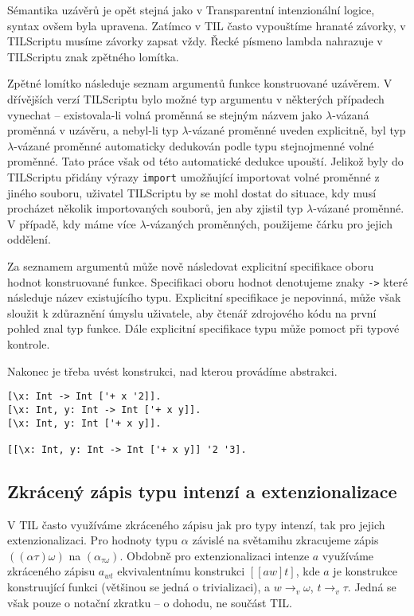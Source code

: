 Sémantika uzávěrů je opět stejná jako v Transparentní intenzionální logice, syntax ovšem byla
upravena. Zatímco v TIL často vypouštíme hranaté závorky, v TILScriptu musíme závorky zapsat vždy.
Řecké písmeno lambda nahrazuje v TILScriptu znak zpětného lomítka.

Zpětné lomítko následuje seznam argumentů funkce konstruované uzávěrem. V dřívějších verzí
TILScriptu bylo možné typ argumentu v některých případech vynechat -- existovala-li volná proměnná
se stejným názvem jako $\lambda$-vázaná proměnná v uzávěru, a nebyl-li typ $\lambda$-vázané
proměnné uveden explicitně, byl typ $\lambda$-vázané proměnné automaticky dedukován podle typu
stejnojmenné volné proměnné. Tato práce však od této automatické dedukce upouští. Jelikož byly
do TILScriptu přidány výrazy \lstinline{import} umožňující importovat volné proměnné z jiného
souboru, uživatel TILScriptu by se mohl dostat do situace, kdy musí procházet několik importovaných
souborů, jen aby zjistil typ $\lambda$-vázané proměnné. V případě, kdy máme více $\lambda$-vázaných
proměnných, použijeme čárku pro jejich oddělení.

Za seznamem argumentů může nově následovat explicitní specifikace oboru hodnot konstruované funkce.
Specifikaci oboru hodnot denotujeme znaky \lstinline{->} které následuje název existujícího typu.
Explicitní specifikace je nepovinná, může však sloužit k zdůraznění úmyslu uživatele, aby čtenář
zdrojového kódu na první pohled znal typ funkce. Dále explicitní specifikace typu může pomoct při
typové kontrole.

Nakonec je třeba uvést konstrukci, nad kterou provádíme abstrakci.

\begin{lstlisting}[caption={Příklad využití uzávěrů}]
[\x: Int -> Int ['+ x '2]].
[\x: Int, y: Int -> Int ['+ x y]].
[\x: Int, y: Int ['+ x y]].

[[\x: Int, y: Int -> Int ['+ x y]] '2 '3].
\end{lstlisting}

\subsection{Zkrácený zápis typu intenzí a extenzionalizace}

V TIL často využíváme zkráceného zápisu jak pro typy intenzí, tak pro jejich extenzionalizaci.
Pro hodnoty typu $\alpha$ závislé na světamihu zkracujeme zápis $((\alpha\tau)\omega)$
na $(\alpha_{\tau\omega})$. Obdobně pro extenzionalizaci intenze $a$ využíváme zkráceného zápisu
$a_{wt}$ ekvivalentnímu konstrukci $[[a w] t]$, kde $a$ je konstrukce konstruující funkci
(většinou se jedná o trivializaci), a $w \rightarrow_v \omega$, $t \rightarrow_v \tau$. Jedná
se však pouze o notační zkratku -- o dohodu, ne součást TIL.

